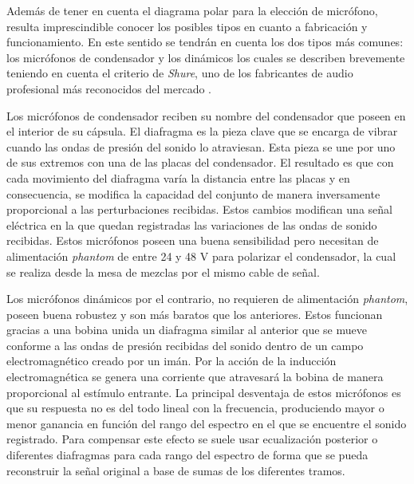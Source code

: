 Además de tener en cuenta el diagrama polar para la elección de micrófono, resulta imprescindible conocer los posibles tipos en cuanto a fabricación y funcionamiento. En este sentido se tendrán en cuenta los dos tipos más comunes: los micrófonos de condensador y los dinámicos los cuales se describen brevemente teniendo en cuenta el criterio de \emph{Shure}, uno de los fabricantes de audio profesional más reconocidos del mercado \cite{shuremic}.

Los micrófonos de condensador reciben su nombre del condensador que poseen en el interior de su cápsula. El diafragma es la pieza clave que se encarga de vibrar cuando las ondas de presión del sonido lo atraviesan. Esta pieza se une por uno de sus extremos con una de las placas del condensador. El resultado es que con cada movimiento del diafragma varía la distancia entre las placas y en consecuencia, se modifica la capacidad del conjunto de manera inversamente proporcional a las perturbaciones recibidas. Estos cambios modifican una señal eléctrica en la que quedan registradas las variaciones de las ondas de sonido recibidas. Estos micrófonos poseen una buena sensibilidad pero necesitan de alimentación \emph{phantom} de entre 24 y 48 V para polarizar el condensador, la cual se realiza desde la mesa de mezclas por el mismo cable de señal.

Los micrófonos dinámicos por el contrario, no requieren de alimentación \emph{phantom}, poseen buena robustez y son más baratos que los anteriores. Estos funcionan gracias a una bobina unida un diafragma similar al anterior que se mueve conforme a las ondas de presión recibidas del sonido dentro de un campo electromagnético creado por un imán. Por la acción de la inducción electromagnética se genera una corriente que atravesará la bobina de manera proporcional al estímulo entrante. La principal desventaja de estos micrófonos es que su respuesta no es del todo lineal con la frecuencia, produciendo mayor o menor ganancia en función del rango del espectro en el que se encuentre el sonido registrado. Para compensar este efecto se suele usar ecualización posterior o diferentes diafragmas para cada rango del espectro de forma que se pueda reconstruir la señal original a base de sumas de los diferentes tramos.

